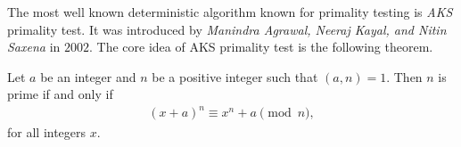 \documentclass{subfiles}
\begin{document}
	The most well known deterministic algorithm known for primality testing is \textit{AKS} primality test. It was introduced by \textit{Manindra Agrawal, Neeraj Kayal, and Nitin Saxena} in $2002$. The core idea of AKS primality test is the following theorem.
		\begin{theorem}
			Let $a$ be an integer and $n$ be a positive integer such that $(a,n)=1$. Then $n$ is prime if and only if
				\begin{align*}
					(x+a)^n \equiv x^n + a \pmod n,
				\end{align*}
			for all integers $x$.
		\end{theorem}
\end{document}
